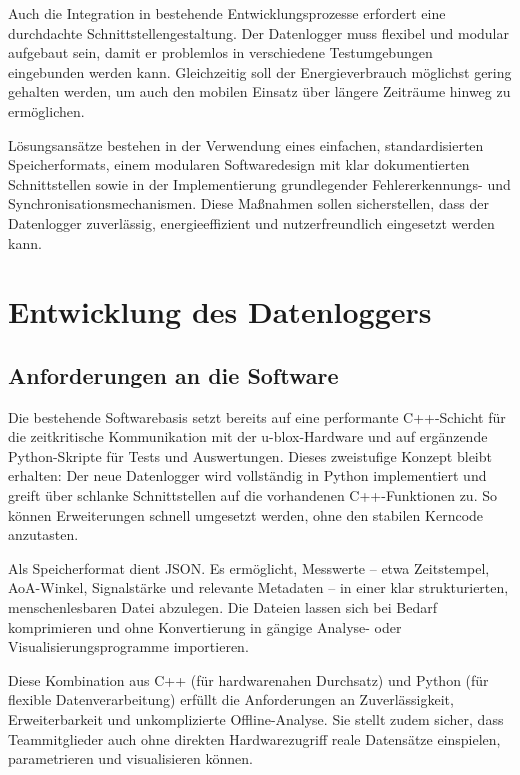 \documentclass[a4paper, 12pt]{article} %
\begin{document}
Auch die Integration in bestehende Entwicklungsprozesse erfordert eine durchdachte Schnittstellengestaltung.
 Der Datenlogger muss flexibel und modular aufgebaut sein, damit er problemlos in verschiedene Testumgebungen 
 eingebunden werden kann. Gleichzeitig soll der Energieverbrauch möglichst gering gehalten werden, um auch den mobilen Einsatz über längere
  Zeiträume hinweg zu ermöglichen.

Lösungsansätze bestehen in der Verwendung eines einfachen, standardisierten Speicherformats, einem modularen 
Softwaredesign mit klar dokumentierten Schnittstellen sowie in der Implementierung grundlegender Fehlererkennungs- und Synchronisationsmechanismen. 
Diese Maßnahmen sollen sicherstellen, dass der Datenlogger zuverlässig, energieeffizient und nutzerfreundlich eingesetzt werden kann.

\clearpage

\section{Entwicklung des Datenloggers}
\subsection{Anforderungen an die Software}
Die bestehende Softwarebasis setzt bereits auf eine performante C++-Schicht für die zeitkritische Kommunikation mit 
der u-blox-Hardware und auf ergänzende Python-Skripte für Tests und Auswertungen. Dieses zweistufige Konzept bleibt erhalten: 
Der neue Datenlogger wird vollständig in Python implementiert und greift über schlanke Schnittstellen auf die vorhandenen C++-Funktionen zu. 
So können Erweiterungen schnell umgesetzt werden, ohne den stabilen Kerncode anzutasten.

Als Speicherformat dient \ac{JSON}. Es ermöglicht, Messwerte – etwa Zeitstempel, \ac{AoA}-Winkel, Signalstärke und relevante Metadaten – in einer 
klar strukturierten, menschenlesbaren Datei abzulegen. Die Dateien lassen sich bei Bedarf komprimieren und ohne Konvertierung in gängige 
Analyse- oder Visualisierungsprogramme importieren.

Diese Kombination aus C++ (für hardwarenahen Durchsatz) und Python (für flexible Daten­verarbeitung) erfüllt die Anforderungen 
an Zuverlässigkeit, Erweiterbarkeit und unkomplizierte Offline-Analyse. Sie stellt zudem sicher, dass Teammitglieder auch ohne direkten 
Hardwarezugriff reale Datensätze einspielen, parametrieren und visualisieren können.
\end{document}
